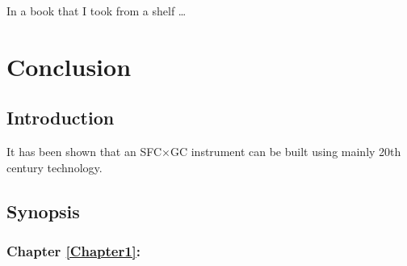 
\begin{savequote}[45mm]
In a book that I took from a shelf \ldots
{}
\end{savequote}

\chapter{Conclusion} %


\label{Chapter8} %



\section{Introduction}

It has been shown that an SFC×GC instrument can be built using mainly 20th century technology. 

\section{Synopsis}

\subsection{Chapter \ref{Chapter1}:  }

